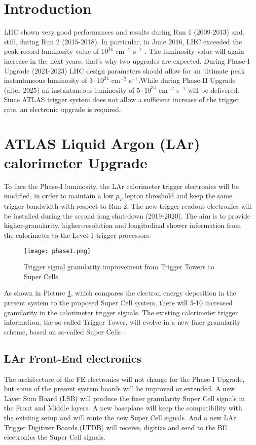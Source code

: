 \documentclass{llncs}
\begin{document}
\section{Introduction}
LHC shown very good performances and results during Run 1 (2009-2013) and, still, during Run 2 (2015-2018). In particular, in June 2016, LHC exceeded the peak record luminosity value of $10^{34}$ cm$^{-2}$ s$^{-1}$ \cite{Pralavorio:2203203}. The luminosity value will again increase in the next years, that's why two upgrades are expected. During Phase-I Upgrade (2021-2023) LHC design parameters should allow for an ultimate peak instantaneous luminosity of $3 \cdot 10^{34}$ cm$^{-2}$ s$^{-1}$.While during Phase-II Upgrade (after 2025) an instantaneous luminosity of $5 \cdot 10^{34}$ cm$^{-2}$ s$^{-1}$ will be delivered. Since ATLAS trigger system does not allow a sufficient increase of the trigger rate, an electronic upgrade is required.

\section{ATLAS Liquid Argon (LAr) calorimeter Upgrade}
To face the Phase-I luminosity, the LAr calorimeter trigger electronics will be modified, in order to maintain a low $p_{T}$ lepton threshold and keep the same trigger bandwidth with respect to Run 2. The new trigger readout electronics will be installed during the second long shut-down (2019-2020). The aim is to provide higher-granularity, higher-resolution and longitudinal shower information from the calorimeter to the Level-1 trigger processors.
\begin{figure}[h]
	\centering	
	\texttt{[image: phaseI.png]}
	\caption{Trigger signal granularity improvement from Trigger Towers to Super Cells.}
	\label{fig:PhaseI}
\end{figure}
As shown in Picture \ref{fig:PhaseI}, which compares the electron energy deposition in the present system to the proposed Super Cell system, there will 5-10 increased granularity in the calorimeter trigger signals.
The existing calorimeter trigger information, the so-called Trigger Tower, will evolve in a new finer granularity scheme, based on so-called Super Cells \cite{Aleksa:1602230}.

\subsection{LAr Front-End electronics}
The architecture of the FE electronics will not change for the Phase-I Upgrade, but some of the present system boards will be improved or extended. A new Layer Sum Board (LSB) will produce the finer granularity Super Cell signals in the Front and Middle layers. A new baseplane will keep the compatibility with the existing setup and will route the new Super Cell signals. And a new LAr Trigger Digitizer Boards (LTDB) will receive, digitize and send to the BE electronics the Super Cell signals.
\end{document}

